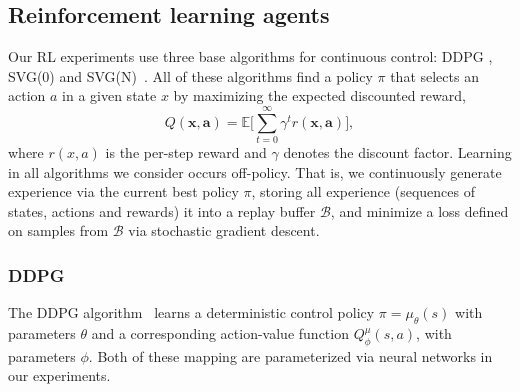 \subsection{Reinforcement learning agents}
\label{sm:sec:reinforcement_learning}
Our RL experiments use three base algorithms for continuous control: DDPG \citep{Lillicrap16}, SVG(0) and SVG(N)~\citep{heess2015learning}. All of these algorithms find a policy $\pi$ that selects an action $a$ in a given state $x$ by maximizing the expected discounted reward,
\begin{equation}
Q(\mathbf{x}, \mathbf{a}) = \mathbb{E} \Big[ \sum_{t=0}^\infty \gamma^t r(\mathbf{x}, \mathbf{a}) \Big],
\end{equation}
where $r(x,a)$ is the per-step reward and $\gamma$ denotes the discount factor.
Learning in all algorithms we consider occurs off-policy. That is, we continuously generate experience via the current best policy $\pi$, storing all experience (sequences of states, actions and rewards) it into a replay buffer $\mathcal{B}$, and minimize a loss defined on samples from $\mathcal{B}$ via stochastic gradient descent.


\subsubsection{DDPG}
\label{sm:sec:ddpg}
The DDPG algorithm~\citep{Lillicrap16} learns a deterministic control policy $\pi = \mu_\theta(s)$ with parameters $\theta$ and a corresponding action-value function $Q_\phi^\mu(s, a)$, with parameters $\phi$. Both of these mapping are parameterized via neural networks in our experiments.

